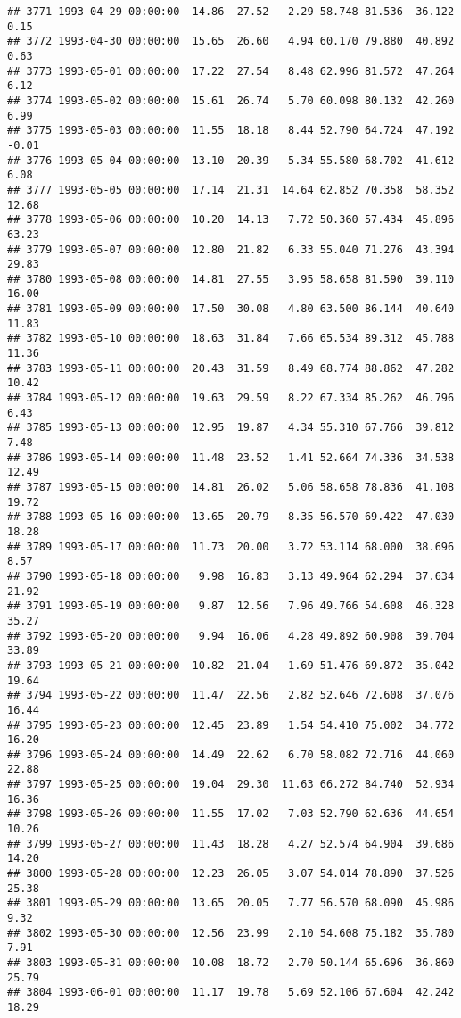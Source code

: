 \documentclass{article}\usepackage{graphicx, color}
\makeatletter
\newenvironment{kframe}{%
 \def\at@end@of@kframe{}%
 \ifinner\ifhmode%
  \def\at@end@of@kframe{\end{minipage}}%
  \begin{minipage}{\columnwidth}%
 \fi\fi%
 \def\FrameCommand##1{\hskip\@totalleftmargin \hskip-\fboxsep
 \colorbox{shadecolor}{##1}\hskip-\fboxsep
     \hskip-\linewidth \hskip-\@totalleftmargin \hskip\columnwidth}%
 \MakeFramed {\advance\hsize-\width
   \@totalleftmargin\z@ \linewidth\hsize
   \@setminipage}}%
 {\par\unskip\endMakeFramed%
 \at@end@of@kframe}
\newenvironment{knitrout}{}{} %
\makeatother
\begin{document}
\begin{knitrout}
\begin{kframe}
\begin{verbatim}
## 3771 1993-04-29 00:00:00  14.86  27.52   2.29 58.748 81.536  36.122   0.15
## 3772 1993-04-30 00:00:00  15.65  26.60   4.94 60.170 79.880  40.892   0.63
## 3773 1993-05-01 00:00:00  17.22  27.54   8.48 62.996 81.572  47.264   6.12
## 3774 1993-05-02 00:00:00  15.61  26.74   5.70 60.098 80.132  42.260   6.99
## 3775 1993-05-03 00:00:00  11.55  18.18   8.44 52.790 64.724  47.192  -0.01
## 3776 1993-05-04 00:00:00  13.10  20.39   5.34 55.580 68.702  41.612   6.08
## 3777 1993-05-05 00:00:00  17.14  21.31  14.64 62.852 70.358  58.352  12.68
## 3778 1993-05-06 00:00:00  10.20  14.13   7.72 50.360 57.434  45.896  63.23
## 3779 1993-05-07 00:00:00  12.80  21.82   6.33 55.040 71.276  43.394  29.83
## 3780 1993-05-08 00:00:00  14.81  27.55   3.95 58.658 81.590  39.110  16.00
## 3781 1993-05-09 00:00:00  17.50  30.08   4.80 63.500 86.144  40.640  11.83
## 3782 1993-05-10 00:00:00  18.63  31.84   7.66 65.534 89.312  45.788  11.36
## 3783 1993-05-11 00:00:00  20.43  31.59   8.49 68.774 88.862  47.282  10.42
## 3784 1993-05-12 00:00:00  19.63  29.59   8.22 67.334 85.262  46.796   6.43
## 3785 1993-05-13 00:00:00  12.95  19.87   4.34 55.310 67.766  39.812   7.48
## 3786 1993-05-14 00:00:00  11.48  23.52   1.41 52.664 74.336  34.538  12.49
## 3787 1993-05-15 00:00:00  14.81  26.02   5.06 58.658 78.836  41.108  19.72
## 3788 1993-05-16 00:00:00  13.65  20.79   8.35 56.570 69.422  47.030  18.28
## 3789 1993-05-17 00:00:00  11.73  20.00   3.72 53.114 68.000  38.696   8.57
## 3790 1993-05-18 00:00:00   9.98  16.83   3.13 49.964 62.294  37.634  21.92
## 3791 1993-05-19 00:00:00   9.87  12.56   7.96 49.766 54.608  46.328  35.27
## 3792 1993-05-20 00:00:00   9.94  16.06   4.28 49.892 60.908  39.704  33.89
## 3793 1993-05-21 00:00:00  10.82  21.04   1.69 51.476 69.872  35.042  19.64
## 3794 1993-05-22 00:00:00  11.47  22.56   2.82 52.646 72.608  37.076  16.44
## 3795 1993-05-23 00:00:00  12.45  23.89   1.54 54.410 75.002  34.772  16.20
## 3796 1993-05-24 00:00:00  14.49  22.62   6.70 58.082 72.716  44.060  22.88
## 3797 1993-05-25 00:00:00  19.04  29.30  11.63 66.272 84.740  52.934  16.36
## 3798 1993-05-26 00:00:00  11.55  17.02   7.03 52.790 62.636  44.654  10.26
## 3799 1993-05-27 00:00:00  11.43  18.28   4.27 52.574 64.904  39.686  14.20
## 3800 1993-05-28 00:00:00  12.23  26.05   3.07 54.014 78.890  37.526  25.38
## 3801 1993-05-29 00:00:00  13.65  20.05   7.77 56.570 68.090  45.986   9.32
## 3802 1993-05-30 00:00:00  12.56  23.99   2.10 54.608 75.182  35.780   7.91
## 3803 1993-05-31 00:00:00  10.08  18.72   2.70 50.144 65.696  36.860  25.79
## 3804 1993-06-01 00:00:00  11.17  19.78   5.69 52.106 67.604  42.242  18.29

\end{verbatim}
\end{kframe}
\end{knitrout}
\end{document}
